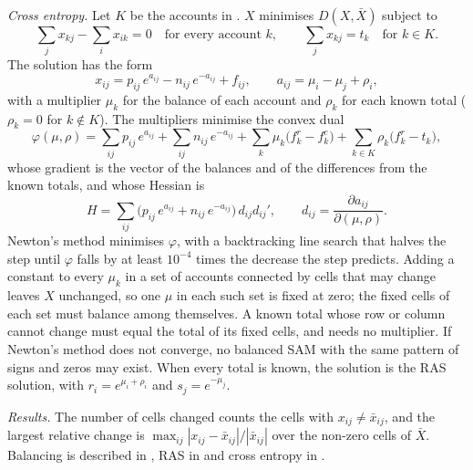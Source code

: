 \textit{Cross entropy.} Let $K$ be the accounts in . $X$
minimises $D(X, \bar X)$ subject to
\begin{equation*}
\sum_j x_{kj} - \sum_i x_{ik} = 0 \quad \text{for every account } k, \qquad
\sum_j x_{kj} = t_k \quad \text{for } k \in K.
\end{equation*}
The solution has the form
\begin{equation*}
x_{ij} = p_{ij}\, e^{a_{ij}} - n_{ij}\, e^{-a_{ij}} + f_{ij}, \qquad
a_{ij} = \mu_i - \mu_j + \rho_i,
\end{equation*}
with a multiplier $\mu_k$ for the balance of each account and $\rho_k$ for
each known total ($\rho_k = 0$ for $k \notin K$). The multipliers minimise the
convex dual
\begin{equation*}
\varphi(\mu, \rho) = \sum_{ij} p_{ij}\, e^{a_{ij}} + \sum_{ij} n_{ij}\, e^{-a_{ij}}
+ \sum_k \mu_k \bigl(f^r_k - f^c_k\bigr) + \sum_{k \in K} \rho_k \bigl(f^r_k - t_k\bigr),
\end{equation*}
whose gradient is the vector of the balances and of the differences from the
known totals, and whose Hessian is
\begin{equation*}
H = \sum_{ij} \bigl(p_{ij}\, e^{a_{ij}} + n_{ij}\, e^{-a_{ij}}\bigr)\, d_{ij} d_{ij}', \qquad
d_{ij} = \frac{\partial a_{ij}}{\partial (\mu, \rho)}.
\end{equation*}
Newton's method minimises $\varphi$, with a backtracking line search that
halves the step until $\varphi$ falls by at least $10^{-4}$ times the decrease
the step predicts. Adding a constant to every $\mu_k$ in a set of accounts
connected by cells that may change leaves $X$ unchanged, so one $\mu$ in each
such set is fixed at zero; the fixed cells of each set must balance among
themselves. A known total whose row or column cannot change must equal the
total of its fixed cells, and needs no multiplier. If Newton's method does not
converge, no balanced SAM with the same pattern of signs and zeros may exist.
When every total is known, the solution is the RAS solution, with $r_i =
e^{\mu_i + \rho_i}$ and $s_j = e^{-\mu_j}$.

\textit{Results.} The number of cells changed counts the cells with $x_{ij} \ne
\bar x_{ij}$, and the largest relative change is $\max_{ij} |x_{ij} - \bar
x_{ij}| / |\bar x_{ij}|$ over the non-zero cells of $\bar X$.
Balancing is described in , RAS in  and
cross entropy in .


